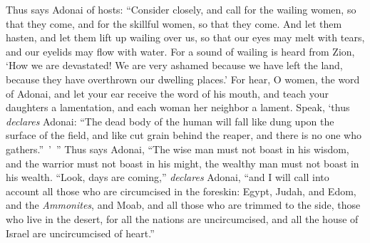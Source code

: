 \begin{biblechapter}
\verse Thus says Adonai of hosts:
\verse “Consider closely, and call for the wailing women, so that they come, 
and for the skillful women, so that they come.
\verse And let them hasten, 
and let them lift up wailing over us, 
so that our eyes may melt with tears, 
and our eyelids may flow with water.
\verse For a sound of wailing is heard from Zion, 
‘How we are devastated! 
We are very ashamed because we have left the land, 
because they have overthrown our dwelling places.’
\verse For hear, O women, the word of Adonai, 
and let your ear receive the word of his mouth, 
and teach your daughters a lamentation, 
and each woman her neighbor a lament.
\verse Speak, ‘thus \textit{declares} Adonai: “The dead body of the human will fall 
like dung upon the surface of the field, 
and like cut grain behind the reaper, 
and there is no one who gathers.” ’ ”
 Thus says Adonai,
\verse “The wise man must not boast in his wisdom, 
and the warrior must not boast in his might, 
the wealthy man must not boast in his wealth.
 “Look, days are coming,” \textit{declares} Adonai, “and I will call into account all those who are circumcised in the foreskin:
\verse Egypt, Judah, and Edom, and the \textit{Ammonites}, and Moab, and all those who are trimmed to the side, those who live in the desert, for all the nations are uncircumcised, and all the house of Israel are uncircumcised of heart.”
\end{biblechapter}

